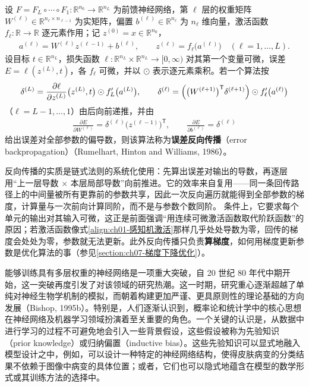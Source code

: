 \documentclass[../../main.tex]{subfiles}
\begin{document}
\begin{definition}[误差反向传播]\label{definition:ch01-误差反向传播}
设 $F=F_{L}\circ\cdots\circ F_{1}:\mathbb{R}^{n_{0}}\to\mathbb{R}^{n_{L}}$ 为前馈神经网络，第 $\ell$ 层的权重矩阵 $W^{(\ell)}\in\mathbb{R}^{n_{\ell}\times n_{\ell-1}}$ 为实矩阵，偏置 $b^{(\ell)}\in\mathbb{R}^{n_{\ell}}$ 为 $n_{\ell}$ 维向量，激活函数 $f_{\ell}:\mathbb{R}\to\mathbb{R}$ 逐元素作用；记 $z^{(0)}=x\in\mathbb{R}^{n_{0}}$，
\begin{align*}
  a^{(\ell)}=W^{(\ell)}z^{(\ell-1)}+b^{(\ell)},\qquad
  z^{(\ell)}=f_{\ell}\bigl(a^{(\ell)}\bigr)\quad(\ell=1,\dots,L).
\end{align*}
设目标 $t\in\mathbb{R}^{n_{L}}$，损失函数 $\ell:\mathbb{R}^{n_{L}}\times\mathbb{R}^{n_{L}}\to[0,\infty)$ 对其第一个变量可微，误差 $E=\ell(z^{(L)},t)$，各 $f_{\ell}$ 可微，并以 $\odot$ 表示逐元素乘积。若一个算法按
\begin{align*}
  \delta^{(L)}=\frac{\partial \ell}{\partial z^{(L)}}\bigl(z^{(L)},t\bigr)\odot f_{L}'\bigl(a^{(L)}\bigr),
  \qquad
  \delta^{(\ell)}=\Bigl(\bigl(W^{(\ell+1)}\bigr)^{\mathsf{T}}\delta^{(\ell+1)}\Bigr)\odot f_{\ell}'\bigl(a^{(\ell)}\bigr)
\end{align*}
（$\ell=L-1,\dots,1$）由后向前递推，并由
\begin{align*}
  \frac{\partial E}{\partial W^{(\ell)}}=\delta^{(\ell)}\bigl(z^{(\ell-1)}\bigr)^{\mathsf{T}},
  \qquad
  \frac{\partial E}{\partial b^{(\ell)}}=\delta^{(\ell)}
\end{align*}
给出误差对全部参数的偏导数，则该算法称为\textbf{误差反向传播}（error backpropagation）（Rumelhart, Hinton and Williams, 1986）。
\end{definition}

\begin{remark}
反向传播的实质是链式法则的系统化使用：先算出误差对输出的导数，再逐层用“上一层导数 × 本层局部导数”向前推进。它的效率来自复用——同一条回传路径上的中间量被所有更靠前的参数共享，因此一次反向遍历就能得到全部参数的梯度，计算量与一次前向计算同阶，而不是与参数个数同阶。
条件上，它要求每个单元的输出对其输入可微，这正是前面强调“用连续可微激活函数取代阶跃函数”的原因；若激活函数像式\eqref{align:ch01-感知机激活}那样几乎处处导数为零，回传的梯度会处处为零，参数就无法更新。此外反向传播只负责\textbf{算梯度}，如何用梯度更新参数是优化算法的事（参见\cref{section:ch07-梯度下降优化}）。
\end{remark}

能够训练具有多层权重的神经网络是一项重大突破，自 20 世纪 80 年代中期开始，这一突破再度引发了对该领域的研究热潮。这一时期，研究重心逐渐超越了单纯对神经生物学机制的模拟，而朝着构建更加严谨、更具原则性的理论基础的方向发展（Bishop, 1995b）。特别是，人们逐渐认识到，概率论和统计学中的核心思想在神经网络及机器学习领域扮演着至关重要的角色。一个关键的认识是，从数据中进行学习的过程不可避免地会引入一些背景假设，这些假设被称为先验知识（prior knowledge）或归纳偏置（inductive bias）。这些先验知识可以显式地融入模型设计之中，例如，可以设计一种特定的神经网络结构，使得皮肤病变的分类结果不依赖于图像中病变的具体位置；或者，它们也可以隐式地蕴含在模型的数学形式或其训练方法的选择中。
\end{document}

